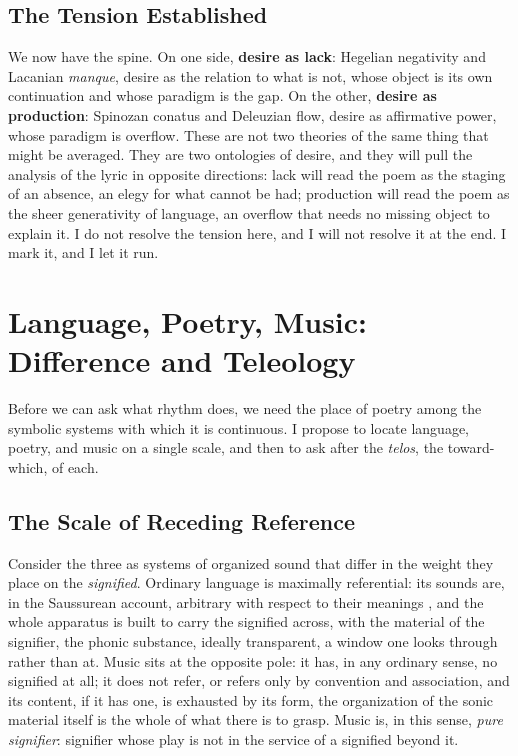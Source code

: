 \subsection{The Tension Established}

We now have the spine. On one side, \textbf{desire as lack}: Hegelian negativity and Lacanian \textit{manque}, desire as the relation to what is not, whose object is its own continuation and whose paradigm is the gap. On the other, \textbf{desire as production}: Spinozan conatus and Deleuzian flow, desire as affirmative power, whose paradigm is overflow. These are not two theories of the same thing that might be averaged. They are two ontologies of desire, and they will pull the analysis of the lyric in opposite directions: lack will read the poem as the staging of an absence, an elegy for what cannot be had; production will read the poem as the sheer generativity of language, an overflow that needs no missing object to explain it. I do not resolve the tension here, and I will not resolve it at the end. I mark it, and I let it run.

\section{Language, Poetry, Music: Difference and Teleology}\label{p08:sec:lpm}

Before we can ask what rhythm does, we need the place of poetry among the symbolic systems with which it is continuous. I propose to locate language, poetry, and music on a single scale, and then to ask after the \emph{telos}, the toward-which, of each.

\subsection{The Scale of Receding Reference}

Consider the three as systems of organized sound that differ in the weight they place on the \emph{signified}. Ordinary language is maximally referential: its sounds are, in the Saussurean account, arbitrary with respect to their meanings \parencite{saussure1916course}, and the whole apparatus is built to carry the signified across, with the material of the signifier, the phonic substance, ideally transparent, a window one looks through rather than at. Music sits at the opposite pole: it has, in any ordinary sense, no signified at all; it does not refer, or refers only by convention and association, and its content, if it has one, is exhausted by its form, the organization of the sonic material itself is the whole of what there is to grasp. Music is, in this sense, \emph{pure signifier}: signifier whose play is not in the service of a signified beyond it.

